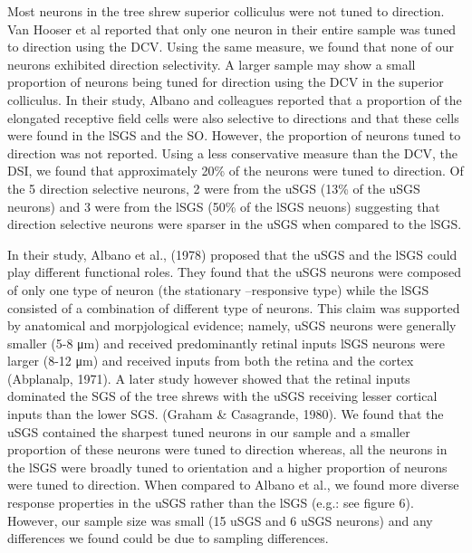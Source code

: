 	Most neurons in the tree shrew superior colliculus were not tuned to direction. Van Hooser et al reported that only one neuron in their entire sample was tuned to direction using the DCV. Using the same measure, we found that none of our neurons exhibited direction selectivity. A larger sample may show a small proportion of neurons being tuned for direction using the DCV in the superior colliculus. In their study, Albano and colleagues reported that a proportion of the elongated receptive field cells were also selective to directions and that these cells were found in the lSGS and the SO. However, the proportion of neurons tuned to direction was not reported. Using a less conservative measure than the DCV, the DSI, we found that approximately 20\% of the neurons were tuned to direction. Of the 5 direction selective neurons, 2 were from the uSGS (13\% of the uSGS neurons) and 3 were from the lSGS (50\% of the lSGS neuons) suggesting that direction selective neurons were sparser in the uSGS when compared to the lSGS.
	
	In their study, Albano et al., (1978) proposed that the uSGS and the lSGS could play different functional roles. They found that the uSGS neurons were composed of only one type of neuron (the stationary –responsive type) while the lSGS consisted of a combination of different type of neurons. This claim was supported by anatomical and morpjological evidence; namely, uSGS neurons were generally smaller (5-8 μm) and received predominantly retinal inputs lSGS neurons were larger (8-12 μm) and received inputs from both the retina and the cortex (Abplanalp, 1971). A later study however showed that the retinal inputs dominated the SGS of the tree shrews with the uSGS receiving lesser cortical inputs than the lower SGS. (Graham \& Casagrande, 1980). We found that the uSGS contained the sharpest tuned neurons in our sample and a smaller proportion of these neurons were tuned to direction whereas, all the neurons in the lSGS were broadly tuned to orientation and a higher proportion of neurons were tuned to direction. When compared to Albano et al., we found more diverse response properties in the uSGS rather than the lSGS (e.g.: see figure 6). However, our sample size was small (15 uSGS and 6 uSGS neurons) and any differences we found could be due to sampling differences.
	
